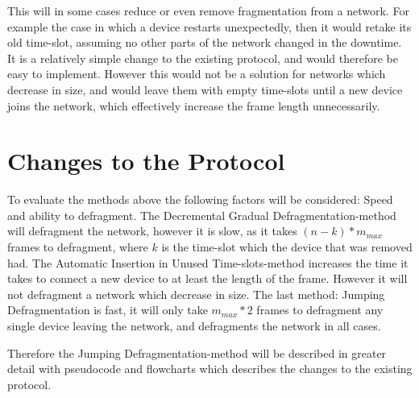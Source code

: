
\bigskip

This will in some cases reduce or even remove fragmentation from a network. 
For example the case in which a device restarts unexpectedly, then it would retake its old time-slot, assuming no other parts of the network changed in the downtime.
It is a relatively simple change to the existing protocol, and would therefore be easy to implement.  
However this would not be a solution for networks which decrease in size, and would leave them with empty time-slots until a new device joins the network, which effectively increase the frame length unnecessarily.

\section{Changes to the Protocol}
To evaluate the methods above the following factors will be considered: Speed and ability to defragment.
The Decremental Gradual Defragmentation-method will defragment the network, however it is slow, as it takes $(n - k) * m_{max}$ frames to defragment, where $k$ is the time-slot which the device  that was removed had. 
The Automatic Insertion in Unused Time-slots-method increases the time it takes to connect a new device to at least the length of the frame. 
However it will not defragment a network which decrease in size. 
The last method: Jumping Defragmentation is fast, it will only take $m_{max} * 2$ frames to defragment any single device leaving the network, and defragments the network in all cases. 

Therefore the Jumping Defragmentation-method will be described in greater detail with pseudocode and flowcharts which describes the changes to the existing protocol. 


